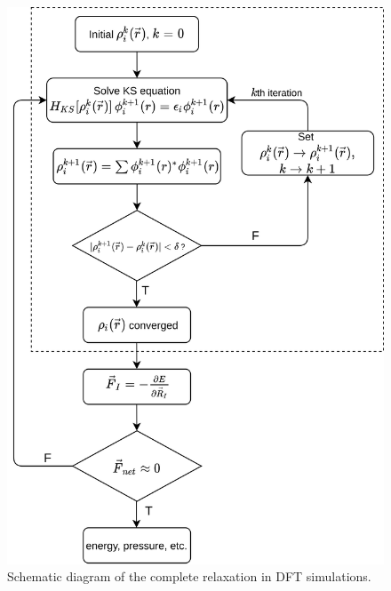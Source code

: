 \begin{figure}[tbh!]
    \centering
    \includegraphics[width=0.65\linewidth]{"images/computational/ionic_relax"}
    \caption[ Schematic diagram of the complete relaxation in DFT simulations]{Schematic diagram of the complete relaxation in DFT simulations.}
    \label{fig:ionic_relax}
\end{figure}




